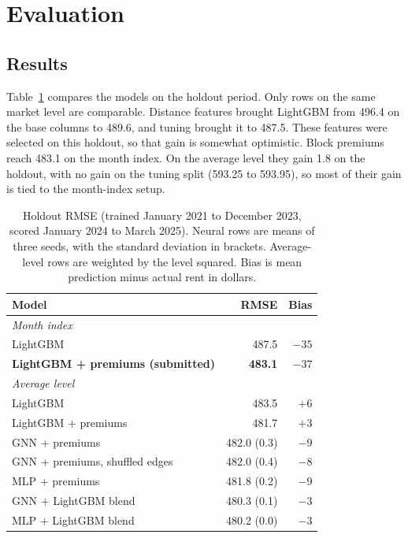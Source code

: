 \section{Evaluation}

\subsection{Results}
\label{sec:results}

Table~\ref{tab:results} compares the models on the holdout period. Only rows on the same market level are comparable. Distance features brought LightGBM from 496.4 on the base columns to 489.6, and tuning brought it to 487.5. These features were selected on this holdout, so that gain is somewhat optimistic. Block premiums reach 483.1 on the month index. On the average level they gain 1.8 on the holdout, with no gain on the tuning split (593.25 to 593.95), so most of their gain is tied to the month-index setup.

\begin{table}[htbp]
\caption{Holdout RMSE (trained January 2021 to December 2023, scored January 2024 to March 2025). Neural rows are means of three seeds, with the standard deviation in brackets. Average-level rows are weighted by the level squared. Bias is mean prediction minus actual rent in dollars.}
\begin{center}
\begin{tabular}{|l|r|r|}
\hline
\textbf{Model} & \textbf{RMSE} & \textbf{Bias} \\
\hline
\multicolumn{3}{|l|}{\emph{Month index}} \\
LightGBM & 487.5 & $-35$ \\
\textbf{LightGBM + premiums (submitted)} & \textbf{483.1} & $-37$ \\
\hline
\multicolumn{3}{|l|}{\emph{Average level}} \\
LightGBM & 483.5 & $+6$ \\
LightGBM + premiums & 481.7 & $+3$ \\
GNN + premiums & 482.0 (0.3) & $-9$ \\
GNN + premiums, shuffled edges & 482.0 (0.4) & $-8$ \\
MLP + premiums & 481.8 (0.2) & $-9$ \\
GNN + LightGBM blend & 480.3 (0.1) & $-3$ \\
MLP + LightGBM blend & 480.2 (0.0) & $-3$ \\
\hline
\end{tabular}
\label{tab:results}
\end{center}
\end{table}

